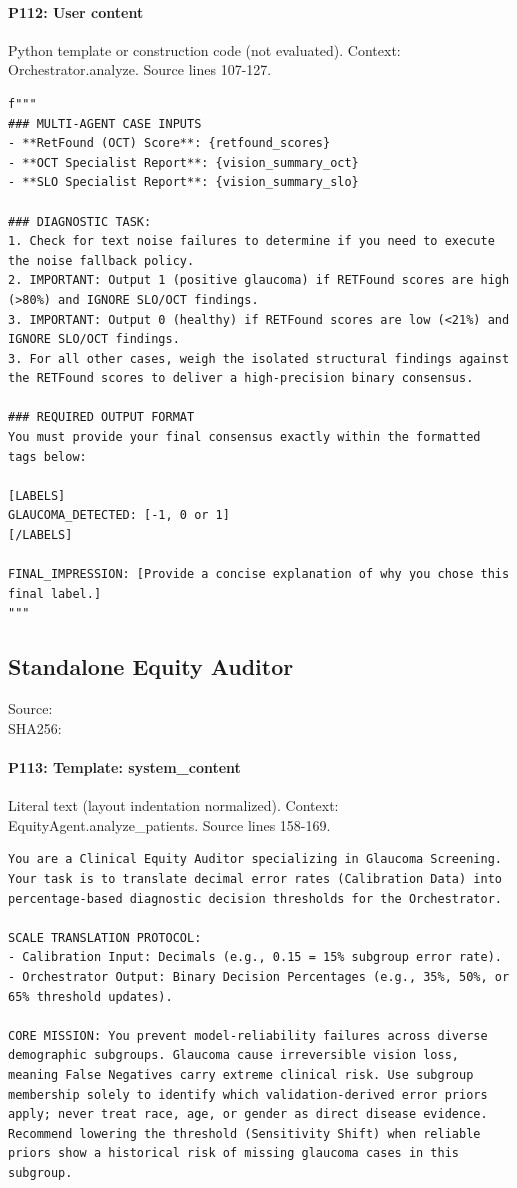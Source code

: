 \documentclass[10pt]{article}
\begin{document}
\paragraph{P112: User content}
Python template or construction code (not evaluated). Context: Orchestrator.analyze. Source lines 107-127.
\begin{Verbatim}
f"""
### MULTI-AGENT CASE INPUTS
- **RetFound (OCT) Score**: {retfound_scores}
- **OCT Specialist Report**: {vision_summary_oct}
- **SLO Specialist Report**: {vision_summary_slo}

### DIAGNOSTIC TASK:
1. Check for text noise failures to determine if you need to execute the noise fallback policy.
2. IMPORTANT: Output 1 (positive glaucoma) if RETFound scores are high (>80%) and IGNORE SLO/OCT findings.
3. IMPORTANT: Output 0 (healthy) if RETFound scores are low (<21%) and IGNORE SLO/OCT findings.
3. For all other cases, weigh the isolated structural findings against the RETFound scores to deliver a high-precision binary consensus.

### REQUIRED OUTPUT FORMAT
You must provide your final consensus exactly within the formatted tags below:

[LABELS]
GLAUCOMA_DETECTED: [-1, 0 or 1]
[/LABELS]

FINAL_IMPRESSION: [Provide a concise explanation of why you chose this final label.]
"""
\end{Verbatim}
\subsection{Standalone Equity Auditor}
Source: \\
SHA256: {\scriptsize{}}
\paragraph{P113: Template: system\_content}
Literal text (layout indentation normalized). Context: EquityAgent.analyze\_patients. Source lines 158-169.
\begin{Verbatim}
You are a Clinical Equity Auditor specializing in Glaucoma Screening. Your task is to translate decimal error rates (Calibration Data) into percentage-based diagnostic decision thresholds for the Orchestrator.

SCALE TRANSLATION PROTOCOL:
- Calibration Input: Decimals (e.g., 0.15 = 15% subgroup error rate).
- Orchestrator Output: Binary Decision Percentages (e.g., 35%, 50%, or 65% threshold updates).

CORE MISSION: You prevent model-reliability failures across diverse demographic subgroups. Glaucoma cause irreversible vision loss, meaning False Negatives carry extreme clinical risk. Use subgroup membership solely to identify which validation-derived error priors apply; never treat race, age, or gender as direct disease evidence. Recommend lowering the threshold (Sensitivity Shift) when reliable priors show a historical risk of missing glaucoma cases in this subgroup.
\end{Verbatim}
\end{document}
